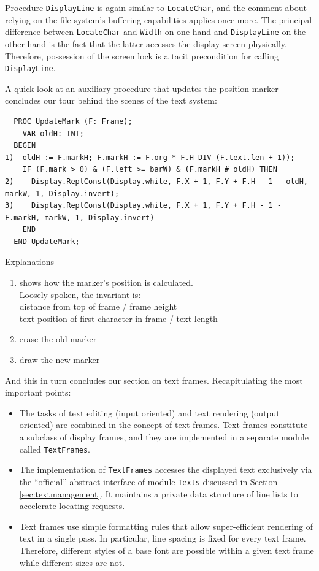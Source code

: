Procedure \verb|DisplayLine| is again similar to \verb|LocateChar|, and the comment about relying on
the file system’s buffering capabilities applies once more. The principal difference between
\verb|LocateChar| and \verb|Width| on one hand and \verb|DisplayLine| on the other hand is the fact
that the latter accesses the display screen physically. Therefore, possession of the screen lock is
a tacit precondition for calling \verb|DisplayLine|.

A quick look at an auxiliary procedure that updates the position marker concludes our tour behind
the scenes of the text system:
\begin{verbatim}
  PROC UpdateMark (F: Frame);
    VAR oldH: INT;
  BEGIN
1)  oldH := F.markH; F.markH := F.org * F.H DIV (F.text.len + 1));
    IF (F.mark > 0) & (F.left >= barW) & (F.markH # oldH) THEN
2)    Display.ReplConst(Display.white, F.X + 1, F.Y + F.H - 1 - oldH, markW, 1, Display.invert);
3)    Display.ReplConst(Display.white, F.X + 1, F.Y + F.H - 1 - F.markH, markW, 1, Display.invert)
    END
  END UpdateMark;
\end{verbatim}

Explanations
\begin{enumerate}
  \item shows how the marker's position is calculated. \\
        Loosely spoken, the invariant is: \\
        distance from top of frame / frame height = \\
        text position of first character in frame / text length
  \item erase the old marker
  \item draw the new marker
\end{enumerate}

And this in turn concludes our section on text frames. Recapitulating the most important points:
\begin{itemize}
  \item The tasks of text editing (input oriented) and text rendering (output oriented) are combined
        in the concept of text frames.  Text frames constitute a subclass of display frames, and they
	are implemented in a separate module called \verb|TextFrames|.
  \item The implementation of \verb|TextFrames| accesses the displayed text exclusively via the
        “official” abstract interface of module \verb|Texts| discussed in Section
	\ref{sec:textmanagement}.  It maintains a private data structure of line lists to accelerate
	locating requests.
  \item Text frames use simple formatting rules that allow super-efficient rendering of text in a
        single pass.  In particular, line spacing is fixed for every text frame. Therefore, different
	styles of a base font are possible within a given text frame while different sizes are not.
\end{itemize}

